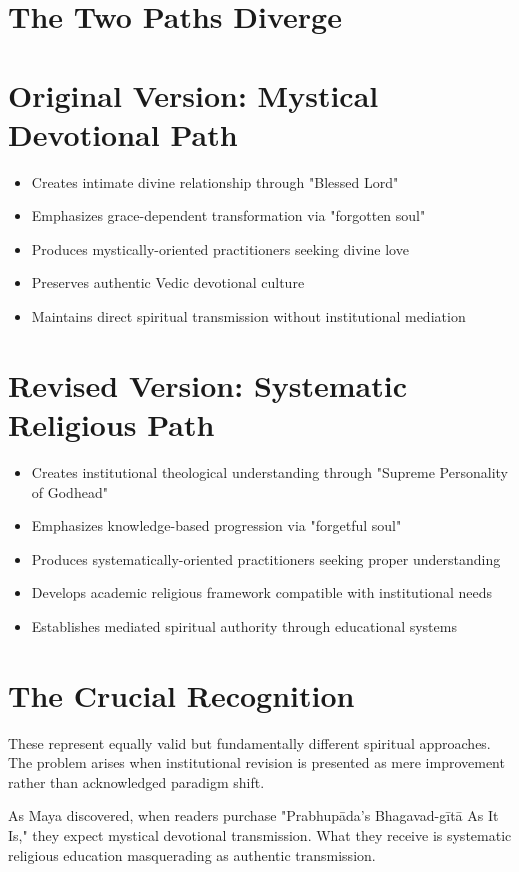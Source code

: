 \documentclass[11pt,twoside]{book}
\begin{document}
\section*{The Two Paths Diverge}
\label{sec:org8c9bbef}

\section*{Original Version: Mystical Devotional Path}
\label{sec:org576ff34}
\begin{itemize}
\item Creates intimate divine relationship through "Blessed Lord"
\item Emphasizes grace-dependent transformation via "forgotten soul"
\item Produces mystically-oriented practitioners seeking divine love
\item Preserves authentic Vedic devotional culture
\item Maintains direct spiritual transmission without institutional mediation
\end{itemize}
\section*{Revised Version: Systematic Religious Path}
\label{sec:orgf14e6c5}
\begin{itemize}
\item Creates institutional theological understanding through "Supreme Personality of Godhead"
\item Emphasizes knowledge-based progression via "forgetful soul"
\item Produces systematically-oriented practitioners seeking proper understanding
\item Develops academic religious framework compatible with institutional needs
\item Establishes mediated spiritual authority through educational systems
\end{itemize}
\section*{The Crucial Recognition}
\label{sec:org0fe6589}

These represent equally valid but fundamentally different spiritual approaches. The problem arises when institutional revision is presented as mere improvement rather than acknowledged paradigm shift.

As Maya discovered, when readers purchase "Prabhupāda's Bhagavad-gītā As It Is," they expect mystical devotional transmission. What they receive is systematic religious education masquerading as authentic transmission.
\end{document}
